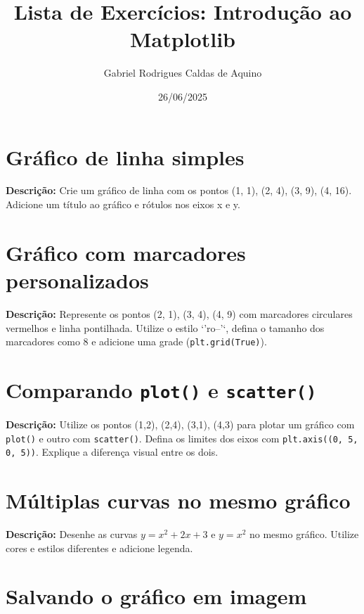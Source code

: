 \title{Lista de Exercícios: Introdução ao Matplotlib}
\author{Gabriel Rodrigues Caldas de Aquino}
\date{26/06/2025}



\maketitle

\section{Gráfico de linha simples}

\textbf{Descrição:}  
Crie um gráfico de linha com os pontos (1, 1), (2, 4), (3, 9), (4, 16).  
Adicione um título ao gráfico e rótulos nos eixos x e y.

\section{Gráfico com marcadores personalizados}

\textbf{Descrição:}  
Represente os pontos (2, 1), (3, 4), (4, 9) com marcadores circulares vermelhos e linha pontilhada.  
Utilize o estilo `'ro--'`, defina o tamanho dos marcadores como 8 e adicione uma grade (\texttt{plt.grid(True)}).

\section{Comparando \texttt{plot()} e \texttt{scatter()}}

\textbf{Descrição:}  
Utilize os pontos (1,2), (2,4), (3,1), (4,3) para plotar um gráfico com \texttt{plot()} e outro com \texttt{scatter()}.  
 Defina os limites dos eixos com \texttt{plt.axis((0, 5, 0, 5))}. Explique a diferença visual entre os dois.


\section{Múltiplas curvas no mesmo gráfico}

\textbf{Descrição:}  
Desenhe as curvas \( y = x^2 + 2x + 3 \) e \( y = x^2 \) no mesmo gráfico.  
Utilize cores e estilos diferentes e adicione legenda.

\section{Salvando o gráfico em imagem}

